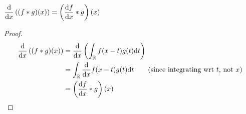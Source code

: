 $\displaystyle \dv{x} \pars{(f\ast g)(x)} = \pars{\dv{f}{x} \ast g}(x)$

\begin{proof}
    \begin{align*}
        \dv{x} \pars{(f\ast g)(x)} &= \dv{x} \pars{\intreal f(x-t)g(t)\dd t} \\
        &=  \intreal \dv{x}f(x-t)g(t)\dd t  \tag{since integrating wrt $t$, not $x$}\\
        &=  \pars{\dv{f}{x} \ast g}(x)
    \end{align*}
\end{proof}